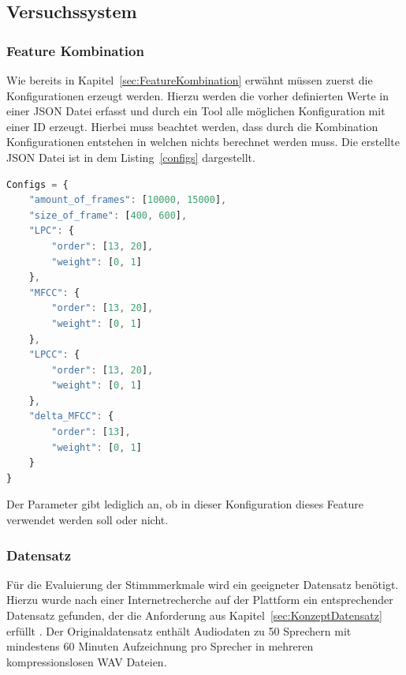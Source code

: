 \subsection{Versuchssystem}

\subsubsection{Feature Kombination}
Wie bereits in Kapitel~\ref{sec:FeatureKombination} erwähnt müssen zuerst die Konfigurationen erzeugt werden.
Hierzu werden die vorher definierten Werte in einer JSON Datei erfasst und durch ein Tool alle möglichen Konfiguration mit einer ID erzeugt.
Hierbei muss beachtet werden, dass durch die Kombination Konfigurationen entstehen in welchen nichts berechnet werden muss.
Die erstellte JSON Datei ist in dem Listing~\ref{configs} dargestellt.
\begin{lstlisting}[language=JavaScript,numbers=none,caption=Konfigurationsmöglichkeiten,label=configs]
Configs = {
    "amount_of_frames": [10000, 15000],
    "size_of_frame": [400, 600],
    "LPC": {
        "order": [13, 20],
        "weight": [0, 1]
    },
    "MFCC": {
        "order": [13, 20],
        "weight": [0, 1]
    },
    "LPCC": {
        "order": [13, 20],
        "weight": [0, 1]
    },
    "delta_MFCC": {
        "order": [13],
        "weight": [0, 1]
    }
}
\end{lstlisting}
Der  Parameter gibt lediglich an, ob in dieser Konfiguration dieses Feature verwendet werden soll oder nicht.

\subsubsection{Datensatz}
Für die Evaluierung der Stimmmerkmale wird ein geeigneter Datensatz benötigt.
Hierzu wurde nach einer Internetrecherche auf der Plattform  ein entsprechender Datensatz gefunden, der die Anforderung aus Kapitel~\ref{sec:KonzeptDatensatz} erfüllt \autocite[vgl.][]{jain_speaker_2019}. 
Der Originaldatensatz enthält Audiodaten zu 50 Sprechern mit mindestens 60 Minuten Aufzeichnung pro Sprecher in mehreren kompressionslosen WAV Dateien.

